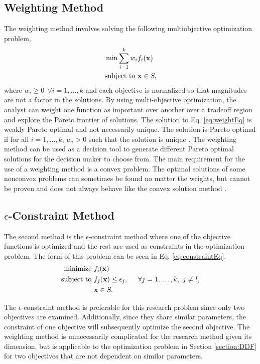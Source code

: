 \subsection*{Weighting Method}
The weighting method involves solving the following multiobjective optimization problem,
\begin{equation}
\begin{aligned}
    &\min \sum^k_{i=1} w_if_i(\mathbf{x})\\
    &\hbox{subject to} \ \mathbf{x}\in S,
\end{aligned}
\label{eq:weightEq}
\end{equation}
where $w_i\geq 0 \ \ \forall i = 1,\dots,k$ and each objective is normalized so that magnitudes are not a factor in the solutions. By using multi-objective optimization, the analyst can weight one function as important over another over a tradeoff region and explore the Pareto frontier of solutions. The solution to Eq. \ref{eq:weightEq} is weakly Pareto optimal and not necessarily unique. The solution is Pareto optimal if for all $i = 1,\dots,k$, $w_i>0$ such that the solution is unique \cite{MultOptCS}. The weighting method can be used as a decision tool to generate different Pareto optimal solutions for the decision maker to choose from. The main requirement for the use of a weighting method is a convex problem. The optimal solutions of some nonconvex problems can sometimes be found no matter the weights, but cannot be proven and does not always behave like the convex solution method \cite{MultOptCS}.\par
\subsection*{$\epsilon$-Constraint Method}
The second method is the $\epsilon$-constraint method where one of the objective functions is optimized and the rest are used as constraints in the optimization problem. The form of this problem can be seen in Eq. \ref{eq:constraintEq}.
\begin{equation}
    \begin{aligned}
    \text{minimize} \ & f_i(\mathbf{x})\\
    \text{subject to} \ & f_j(\mathbf{x})\leq \epsilon_j, \hspace{0.5cm} \forall j = 1,\dots,k, \ j\neq l,\\
    & \mathbf{x}\in S.
    \end{aligned}
    \label{eq:constraintEq}
\end{equation}
\par
The $\epsilon$-constraint method is preferable for this research problem since only two objectives are examined. Additionally, since they share similar parameters, the constraint of one objective will subsequently optimize the second objective. The weighting method is unnecessarily complicated for the research method given its dimension, but is applicable to the optimization problem in Section \ref{section:DDF} for two objectives that are not dependent on similar parameters.

